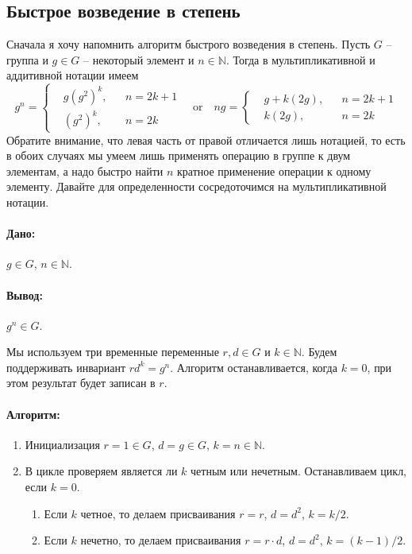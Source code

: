 \subsection{Быстрое возведение в степень}

Сначала я хочу напомнить алгоритм быстрого возведения в степень. Пусть $G$ -- группа и $g\in G$ -- некоторый элемент и $n \in \mathbb N$. Тогда в мультипликативной и аддитивной нотации имеем
\[
g^n = 
\left\{
\begin{aligned}
&g (g^2)^{k}, & &n = 2k + 1\\
&(g^2)^k, & &n = 2k
\end{aligned}
\right.
\quad\text{or}\quad
ng = 
\left\{
\begin{aligned}
&g + k(2g), & &n = 2k + 1\\
&k (2g), & &n = 2k
\end{aligned}
\right.
\]
Обратите внимание, что левая часть от правой отличается лишь нотацией, то есть в обоих случаях мы умеем лишь применять операцию в группе к двум элементам, а надо быстро найти $n$ кратное применение операции к одному элементу. Давайте для определенности сосредоточимся на мультипликативной нотации.

\paragraph{Дано:}

$g\in G$, $n\in \mathbb N$.

\paragraph{Вывод:}

$g^n\in G$.

Мы используем три временные переменные $r, d\in G$ и $k\in \mathbb N$. Будем поддерживать инвариант  $r d^k = g^n$. Алгоритм останавливается, когда $k = 0$, при этом результат будет записан в $r$.

\paragraph{Алгоритм:}

\begin{enumerate}
\item Инициализация $r = 1\in G$, $d = g \in G$, $k = n\in \mathbb N$.

\item В цикле проверяем является ли $k$ четным или нечетным. Останавливаем цикл, если $k = 0$.
\begin{enumerate}
\item Если $k$ четное, то делаем присваивания $r = r$, $d = d^2$, $k = k / 2$.
\item Если $k$ нечетно, то делаем присваивания $r = r \cdot d$, $d = d^2$, $k = (k-1) / 2$.
\end{enumerate}
\end{enumerate}

